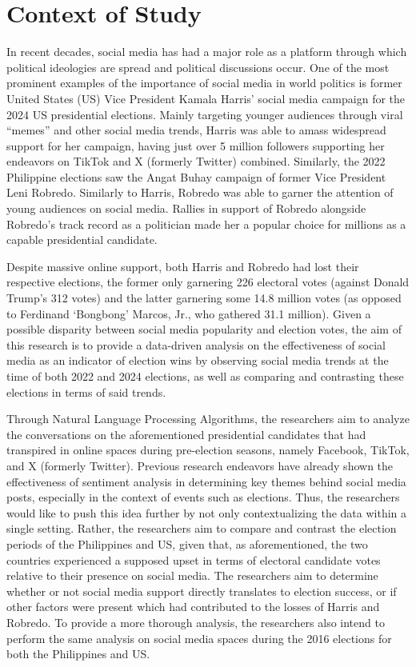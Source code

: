 
\section{Context of Study}
In recent decades, social media has had a major role as a platform through which political ideologies are spread and political discussions occur. One of the most prominent examples of the importance of social media in world politics is former United States (US) Vice President Kamala Harris’ social media campaign for the 2024 US presidential elections. Mainly targeting younger audiences through viral “memes” and other social media trends, Harris was able to amass widespread support for her campaign, having just over 5 million followers supporting her endeavors on TikTok and X (formerly Twitter) combined.\cite{CTX_Lee-2024} Similarly, the 2022 Philippine elections saw the Angat Buhay campaign of former Vice President Leni Robredo. Similarly to Harris, Robredo was able to garner the attention of young audiences on social media. Rallies in support of Robredo alongside Robredo’s track record as a politician made her a popular choice for millions as a capable presidential candidate.\cite{CTX_Johnson-2022}

Despite massive online support, both Harris and Robredo had lost their respective elections, the former only garnering 226 electoral votes (against Donald Trump’s 312 votes) and the latter garnering some 14.8 million votes (as opposed to Ferdinand ‘Bongbong’ Marcos, Jr., who gathered 31.1 million).\cite{CTX_ABSCBN-2022,CTX_BBC-2024} Given a possible disparity between social media popularity and election votes, the aim of this research is to provide a data-driven analysis on the effectiveness of social media as an indicator of election wins by observing social media trends at the time of both 2022 and 2024 elections, as well as comparing and contrasting these elections in terms of said trends.

Through Natural Language Processing Algorithms, the researchers aim to analyze the conversations on the aforementioned presidential candidates that had transpired in online spaces during pre-election seasons, namely Facebook, TikTok, and X (formerly Twitter). Previous research endeavors have already shown the effectiveness of sentiment analysis in determining key themes behind social media posts, especially in the context of events such as elections. Thus, the researchers would like to push this idea further by not only contextualizing the data within a single setting. Rather, the researchers aim to compare and contrast the election periods of the Philippines and US, given that, as aforementioned, the two countries experienced a supposed upset in terms of electoral candidate votes relative to their presence on social media. The researchers aim to determine whether or not social media support directly translates to election success, or if other factors were present which had contributed to the losses of Harris and Robredo. To provide a more thorough analysis, the researchers also intend to perform the same analysis on social media spaces during the 2016 elections for both the Philippines and US.
